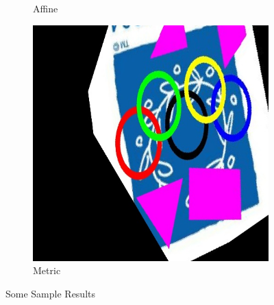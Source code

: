 \documentclass[paper=a4, fontsize=11pt]{scrartcl} %
\begin{document}
\begin{figure}
\begin{subfigure}[ht]{0.3\textwidth}
        \caption{Affine\label{fig:img11_aff}}    
    \end{subfigure}
    \hfill
    \begin{subfigure}[ht]{0.3\textwidth}   
        \centering 
        \includegraphics[width=\textwidth]{figures/img11_met.jpg}
        \caption{Metric\label{fig:img11_met}}
    \end{subfigure}
    \caption{Some Sample Results\label{fig:res1}}
\end{figure}
\end{document}

